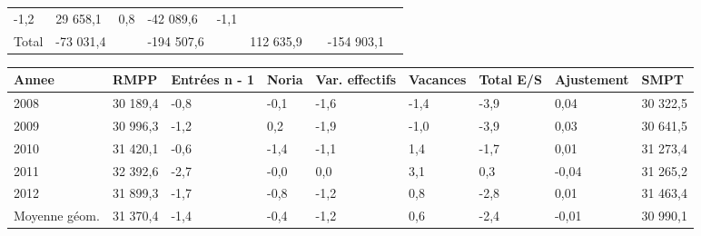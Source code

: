 \begin{longtable}[]{@{}lllllllll@{}}
\begin{minipage}[t]{0.06\columnwidth}
-1,2\strut
\end{minipage} & \begin{minipage}[t]{0.12\columnwidth}\raggedright
29 658,1\strut
\end{minipage} & \begin{minipage}[t]{0.06\columnwidth}\raggedright
0,8\strut
\end{minipage} & \begin{minipage}[t]{0.09\columnwidth}\raggedright
-42 089,6\strut
\end{minipage} & \begin{minipage}[t]{0.06\columnwidth}\raggedright
-1,1\strut
\end{minipage}\tabularnewline
\begin{minipage}[t]{0.05\columnwidth}\raggedright
Total\strut
\end{minipage} & \begin{minipage}[t]{0.10\columnwidth}\raggedright
-73 031,4\strut
\end{minipage} & \begin{minipage}[t]{0.06\columnwidth}\raggedright
\strut
\end{minipage} & \begin{minipage}[t]{0.16\columnwidth}\raggedright
-194 507,6\strut
\end{minipage} & \begin{minipage}[t]{0.06\columnwidth}\raggedright
\strut
\end{minipage} & \begin{minipage}[t]{0.12\columnwidth}\raggedright
112 635,9\strut
\end{minipage} & \begin{minipage}[t]{0.06\columnwidth}\raggedright
\strut
\end{minipage} & \begin{minipage}[t]{0.09\columnwidth}\raggedright
-154 903,1\strut
\end{minipage} & \begin{minipage}[t]{0.06\columnwidth}\raggedright
\strut
\end{minipage}\tabularnewline
\bottomrule
\end{longtable}

\begin{longtable}[]{@{}lllllllll@{}}
\toprule
Annee & RMPP & Entrées n - 1 & Noria & Var. effectifs & Vacances & Total
E/S & Ajustement & SMPT\tabularnewline
\midrule
\endhead
2008 & 30 189,4 & -0,8 & -0,1 & -1,6 & -1,4 & -3,9 & 0,04 & 30
322,5\tabularnewline
2009 & 30 996,3 & -1,2 & 0,2 & -1,9 & -1,0 & -3,9 & 0,03 & 30
641,5\tabularnewline
2010 & 31 420,1 & -0,6 & -1,4 & -1,1 & 1,4 & -1,7 & 0,01 & 31
273,4\tabularnewline
2011 & 32 392,6 & -2,7 & -0,0 & 0,0 & 3,1 & 0,3 & -0,04 & 31
265,2\tabularnewline
2012 & 31 899,3 & -1,7 & -0,8 & -1,2 & 0,8 & -2,8 & 0,01 & 31
463,4\tabularnewline
Moyenne géom. & 31 370,4 & -1,4 & -0,4 & -1,2 & 0,6 & -2,4 & -0,01 & 30
990,1\tabularnewline
\bottomrule
\end{longtable}

